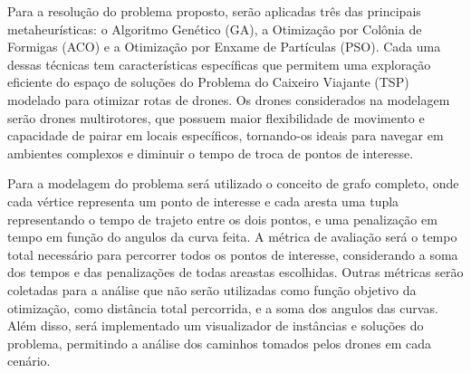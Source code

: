 \documentclass[
	12pt,				%
	openright,			%
	oneside,			%
	a4paper,			%
	chapter=TITLE,		%
	subsection=TITLE,	%
	english,			%
	brazil,				%
	]{abntex2}
\begin{document}
Para a resolução do problema proposto, serão aplicadas três das principais metaheurísticas: o Algoritmo Genético (GA), a Otimização por Colônia de Formigas (ACO) e a Otimização por Enxame de Partículas (PSO). Cada uma dessas técnicas tem características específicas que permitem uma exploração eficiente do espaço de soluções do Problema do Caixeiro Viajante (TSP) modelado para otimizar rotas de drones. Os drones considerados na modelagem serão drones multirotores, que possuem maior flexibilidade de movimento e capacidade de pairar em locais específicos, tornando-os ideais para navegar em ambientes complexos e diminuir o tempo de troca de pontos de interesse.

Para a modelagem do problema será utilizado o conceito de grafo completo, onde cada vértice representa um ponto de interesse e cada aresta uma tupla representando o tempo de trajeto entre os dois pontos, e uma penalização em tempo em função do angulos da curva feita. A métrica de avaliação será o tempo total necessário para percorrer todos os pontos de interesse, considerando a soma dos tempos e das penalizações de todas areastas escolhidas. Outras métricas serão coletadas para a análise que não serão utilizadas como função objetivo da otimização, como distância total percorrida, e a soma dos angulos das curvas. Além disso, será implementado um visualizador de instâncias e soluções do problema, permitindo a análise dos caminhos tomados pelos drones em cada cenário.






\end{document}
